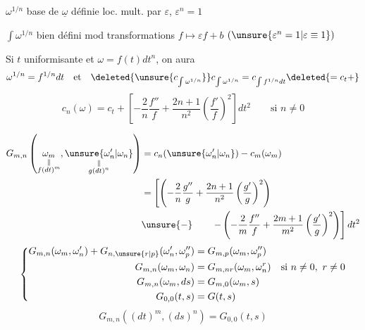 $\omega^{1/n}$ base de $\underline\omega$ définie loc.  mult.
par $\varepsilon$, $\varepsilon^n=1$

$\int\omega^{1/n}$ bien défini mod transformations
$f\longmapsto\varepsilon f+b$ $(\unsure{\varepsilon^n=1|\varepsilon\equiv1})$

Si $t$ uniformisante et $\omega=f(t)dt^n$, on aura
\[
\omega^{1/n}=f^{1/n}dt\quad\text{et}\quad
\deleted{\unsure{c_{\int\omega^{1/n}}}}
c_{\int\omega^{1/n}}=c_{\int f^{1/n}dt}\deleted{=c_t+}
\]
\[
c_n(\omega)=c_t+\left[-\frac2n\frac{f''}{f}
+\frac{2n+1}{n^2}\left(\frac{f'}f\right)^2\right]dt^2
\qquad\text{si }n\ne0
\]

\[
\begin{aligned}
G_{m,n}\left(
\underset{\substack{\Vert\\f(dt)^m}}{\omega_m},
\underset{\substack{\Vert\\g(dt)^n}}{\unsure{\omega'_n|\omega_n}}\right)
&=c_n(\unsure{\omega'_n|\omega_n})-c_m(\omega_m)\\
&=\left[\left(-\frac2n\frac{g''}{g}
+\frac{2n+1}{n^2}\left(\frac{g'}g\right)^2\right)\right.\\
&\unsure{-}\qquad\left.-\left(-\frac2m\frac{f''}f
+\frac{2m+1}{m^2}\left(\frac{g'}g\right)^2\right)\right]dt^2
\end{aligned}
\]
\[
\left\{\begin{aligned}
G_{m,n}(\omega_m,\omega'_n)+G_{n,\unsure{r|p}}(\omega'_n,\omega''_p)
&=G_{m,p}(\omega_m,\omega''_p)\\
G_{m,n}(\omega_m,\omega_n)&=G_{m,nr}(\omega_m,\omega_n^r)
\quad\text{si }n\ne0,\ r\ne0\\
G_{m,n}(\omega_m,ds)&=G_{m,0}(\omega_m,s)\\
G_{0,0}(t,s)&=G(t,s)
\end{aligned}\right.
\]
\inserted{\[
G_{m,n}(\omega_m,(ds)^n)=G_{m,0}(\omega_m,s)
\]}
\[
G_{m,n}((dt)^m,(ds)^n)=G_{0,0}(t,s)
\]

